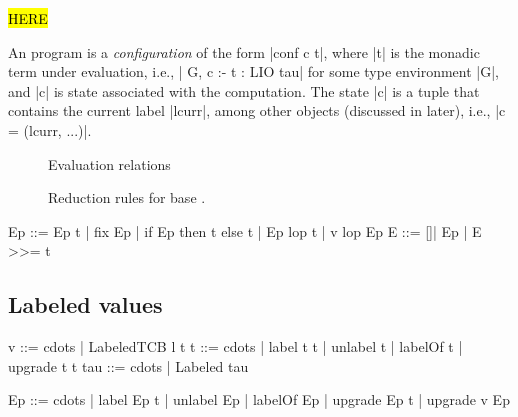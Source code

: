 \hl{HERE}

An \lio{} program is a \emph{configuration} of the form |conf c t|,
where |t| is the monadic term under evaluation, i.e., | G, c :- t :
LIO tau| for some type environment |G|, and |c| is state associated
with the computation.
%
The state |c| is a tuple that contains the current label |lcurr|,
among other objects (discussed in later), i.e., |c = (lcurr, ...)|.
%

\begin{figure}[ht]
\small
{}
\caption{Evaluation relations}
\end{figure}


\begin{figure}[t] %
\small
{}
\caption{Reduction rules for base \lio.}
\end{figure}

\begin{code}
Ep  ::= Ep t | fix Ep | if Ep then t else t 
      | Ep lop t | v lop Ep
E  ::= []| Ep | E >>= t 
\end{code}

\subsection{Labeled values}

\begin{code}
v    ::= cdots  | LabeledTCB l t
t    ::= cdots  | label t t | unlabel t | labelOf t
                | upgrade t t
tau  ::= cdots  | Labeled tau

Ep   ::= cdots  | label Ep t | unlabel Ep | labelOf Ep
                | upgrade Ep t | upgrade v Ep
\end{code}

